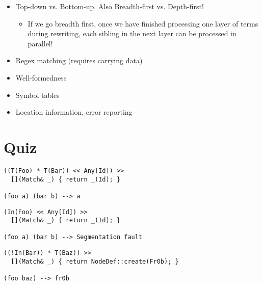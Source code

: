 \documentclass{article}
\begin{document}
\begin{itemize}
\item Top-down vs. Bottom-up. Also Breadth-first vs. Depth-first!
  \begin{itemize}
  \item If we go breadth first, once we have finished processing
    one layer of terms during rewriting, each sibling in the next
    layer can be processed in parallel!
  \end{itemize}
\item Regex matching (requires carrying data)
\item Well-formedness
\item Symbol tables
\item Location information, error reporting
\end{itemize}

\section*{Quiz}

\begin{verbatim}
((T(Foo) * T(Bar)) << Any[Id]) >>
  [](Match& _) { return _(Id); }

(foo a) (bar b) --> a
\end{verbatim}

\begin{verbatim}
(In(Foo) << Any[Id]) >>
  [](Match& _) { return _(Id); }

(foo a) (bar b) --> Segmentation fault
\end{verbatim}

\begin{verbatim}
((!In(Bar)) * T(Baz)) >>
  [](Match& _) { return NodeDef::create(Fr0b); }

(foo baz) --> fr0b
\end{verbatim}
\end{document}
